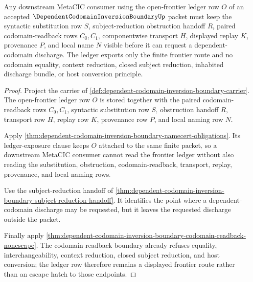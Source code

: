 \begin{theorem}
\label{thm:dependent-codomain-inversion-boundary-ledger-nonescape}
Any downstream MetaCIC consumer using the open-frontier ledger row $O$ of an accepted $\DependentCodomainInversionBoundaryUp$ packet must keep the syntactic substitution row $S$, subject-reduction obstruction handoff $R$, paired codomain-readback rows $C_0,C_1$, componentwise transport $H$, displayed replay $K$, provenance $P$, and local name $N$ visible before it can request a dependent-codomain discharge. The ledger exports only the finite frontier route and no codomain equality, context reduction, closed subject reduction, inhabited discharge bundle, or host conversion principle.
\end{theorem}
\begin{proof}
Project the carrier of \autoref{def:dependent-codomain-inversion-boundary-carrier}. The open-frontier ledger row $O$ is stored together with the paired codomain-readback rows $C_0,C_1$, syntactic substitution row $S$, obstruction handoff $R$, transport row $H$, replay row $K$, provenance row $P$, and local naming row $N$.

Apply \autoref{thm:dependent-codomain-inversion-boundary-namecert-obligations}. Its ledger-exposure clause keeps $O$ attached to the same finite packet, so a downstream MetaCIC consumer cannot read the frontier ledger without also reading the substitution, obstruction, codomain-readback, transport, replay, provenance, and local naming rows.

Use the subject-reduction handoff of \autoref{thm:dependent-codomain-inversion-boundary-subject-reduction-handoff}. It identifies the point where a dependent-codomain discharge may be requested, but it leaves the requested discharge outside the packet.

Finally apply \autoref{thm:dependent-codomain-inversion-boundary-codomain-readback-nonescape}. The codomain-readback boundary already refuses equality, interchangeability, context reduction, closed subject reduction, and host conversion; the ledger row therefore remains a displayed frontier route rather than an escape hatch to those endpoints.
\end{proof}

